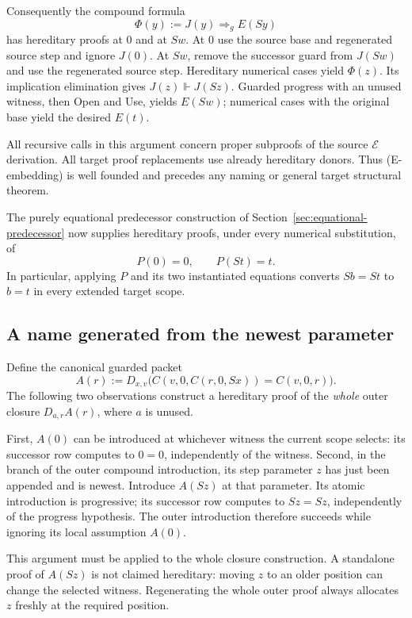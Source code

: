 Consequently the compound formula
\[
 \Phi(y):=J(y)\Rightarrow_g E(Sy)
\]
has hereditary proofs at $0$ and at $Sw$.  At $0$ use the source base
and regenerated source step and ignore $J(0)$.  At $Sw$, remove the
successor guard from $J(Sw)$ and use the regenerated source step.
Hereditary numerical cases yield $\Phi(z)$.  Its implication elimination
gives $J(z)\Vdash J(Sz)$.  Guarded progress with an unused witness,
then Open and Use, yields $E(Sw)$; numerical cases with the original
base yield the desired $E(t)$.

All recursive calls in this argument concern proper subproofs of the
source $\mathcal E$ derivation.  All target proof replacements use
already hereditary donors.  Thus (E-embedding) is well founded and
precedes any naming or general target structural theorem.

The purely equational predecessor construction of
Section~\ref{sec:equational-predecessor} now supplies hereditary proofs,
under every numerical substitution, of
\[
 P(0)=0,\qquad P(St)=t.
\]
In particular, applying $P$ and its two instantiated equations converts
$Sb=St$ to $b=t$ in every extended target scope.

\subsection{A name generated from the newest parameter}

Define the canonical guarded packet
\[
 A(r):=D_{x,v}\bigl(
 C(v,0,C(r,0,Sx))=C(v,0,r)\bigr).
\]
The following two observations construct a hereditary proof of the
\emph{whole} outer closure $D_{a,r}A(r)$, where $a$ is unused.

First, $A(0)$ can be introduced at whichever witness the current scope
selects: its successor row computes to $0=0$, independently of the
witness.  Second, in the branch of the outer compound introduction, its
step parameter $z$ has just been appended and is newest.  Introduce
$A(Sz)$ at that parameter.  Its atomic introduction is progressive;
its successor row computes to $Sz=Sz$, independently of the progress
hypothesis.  The outer introduction therefore succeeds while ignoring
its local assumption $A(0)$.

This argument must be applied to the whole closure construction.  A
standalone proof of $A(Sz)$ is not claimed hereditary: moving $z$ to an
older position can change the selected witness.  Regenerating the whole
outer proof always allocates $z$ freshly at the required position.

